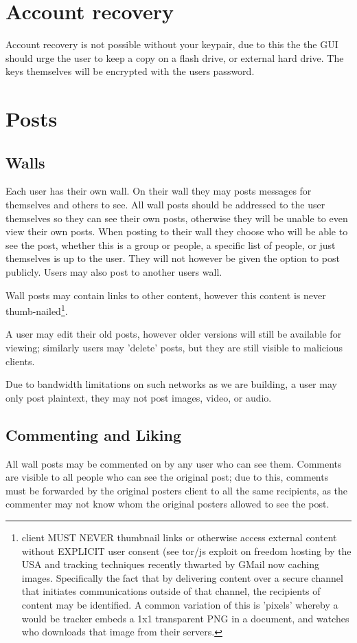 \section{Account recovery}
Account recovery is not possible without your keypair, due to this the the GUI
should urge the user to keep a copy on a flash drive, or external hard drive.
The keys themselves will be encrypted with the users password.

\section{Posts}
\subsection{Walls}
Each user has their own wall. On their wall they may posts messages for
themselves and others to see. All wall posts should be addressed to the user
themselves so they can see their own posts, otherwise they will be unable to even
view their own posts. When posting to their wall they choose who will be able to
see the post, whether this is a group or people, a specific list of people, or
just themselves is up to the user. They will not however be given the option to
post publicly. Users may also post to another users wall.

Wall posts may contain links to other content, however this content is never
thumb-nailed\footnote{client MUST NEVER thumbnail links or otherwise access
external content without EXPLICIT user consent (see tor/js exploit on freedom
hosting by the USA and tracking techniques recently thwarted by GMail now
caching images. Specifically the fact that by delivering content over a secure
channel that initiates communications outside of that channel, the recipients of
content may be identified. A common variation of this is 'pixels' whereby a
would be tracker embeds a 1x1 transparent PNG in a document, and watches who
downloads that image from their servers.\cite{webbug}}.

A user may edit their old posts, however older versions will still be available
for viewing; similarly users may 'delete' posts, but they are still visible to
malicious clients.

Due to bandwidth limitations on such networks as we are building, a user may
only post plaintext, they may not post images, video, or audio.

\subsection{Commenting and Liking}
All wall posts may be commented on by any user who can see them. Comments are
visible to all people who can see the original post; due to this, comments must
be forwarded by the original posters client to all the same recipients, as the
commenter may not know whom the original posters allowed to see the post.

